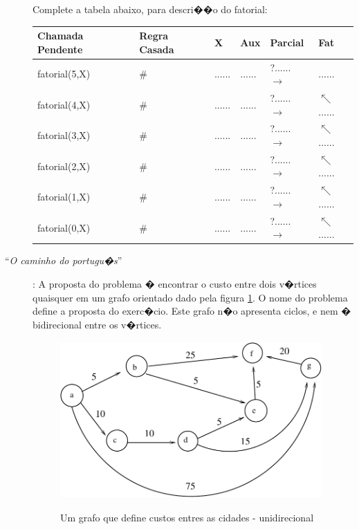 \documentclass[final,a4paper]{article}
\begin{document}
\begin{description}
{\begin{verbatim}
\end{verbatim}
}

Complete a tabela abaixo, para descri��o do fatorial:\\
{\small
\begin{center}
\begin{tabular}
[c]{|l|l|l|l|l|l|}\hline
\textbf{Chamada Pendente} & \textbf{Regra Casada} & \textbf{X} & \textbf{Aux} & \textbf{Parcial} & \textbf{Fat} \\ \hline
{\small fatorial}(5,X) & \# & ...... & ...... & ?...... $\rightarrow$ &
......\\\hline
{\small fatorial}(4,X) & \# & ...... & ...... & ?...... $\rightarrow$ &
$\nwarrow$......\\\hline
{\small fatorial}(3,X) & \# & ...... & ...... & ?...... $\rightarrow$ &
$\nwarrow$......\\\hline
{\small fatorial}(2,X) & \# & ...... & ...... & ?...... $\rightarrow$ &
$\nwarrow$......\\\hline
{\small fatorial}(1,X) & \# & ...... & ...... & ?...... $\rightarrow$ &
$\nwarrow$......\\\hline
{\small fatorial}(0,X) & \# & ...... & ...... & ?...... $\rightarrow$ &
$\nwarrow$......\\\hline
\end{tabular}
\end{center}
}


\newpage
\item [``{\em O caminho do portugu�s}'']: A proposta do problema
� encontrar o custo entre dois v�rtices quaisquer
em um grafo orientado dado pela figura \ref{portuges}.
O nome do problema define a proposta do exerc�cio. Este grafo
n�o apresenta ciclos, e nem � bidirecional entre os v�rtices.

\begin{figure}[!htb]
\centering
\includegraphics[height=6cm, width=10cm]{figuras/portugues.pdf}
\label{portuges}
\caption{Um grafo que define custos entres as cidades - unidirecional}
\end{figure}


\end{description}
\end{document}
